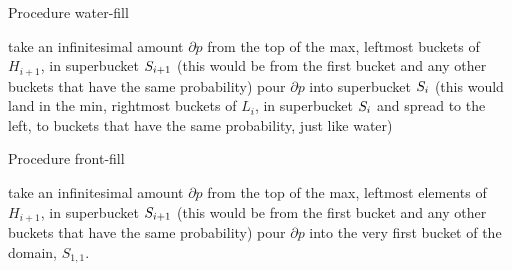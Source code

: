 \begin{algorithm}[H]
  \caption{Procedure \textsf{water-fill}}
  \begin{algorithmic}[1]
  \State take an infinitesimal amount $\partial p$ from the top of the max, leftmost buckets
             of $H_{i+1}$, in superbucket $S_{i+1}$ (this would
             be from the first bucket and any other buckets that have the same probability)
  \State pour $\partial p$ into superbucket $S_i$    (this would land in the min, rightmost buckets of 
           $L_{i}$, in superbucket $S_{i}$ and spread to the left, to buckets that have the same probability, 
           just like water)
  \end{algorithmic}
\end{algorithm}
\begin{algorithm}[H]
  \caption{Procedure \textsf{front-fill}}
  \begin{algorithmic}[1]
  \State take an infinitesimal amount $\partial p$ from the top of the max, leftmost elements
             of $H_{i+1}$, in superbucket $S_{i+1}$ (this would
             be from the first bucket and any other buckets that have the same probability)
  \State pour $\partial p$ into the very first bucket of the domain, $S_{1,1}$.
  \EndWhile
  \end{algorithmic}
\end{algorithm}
